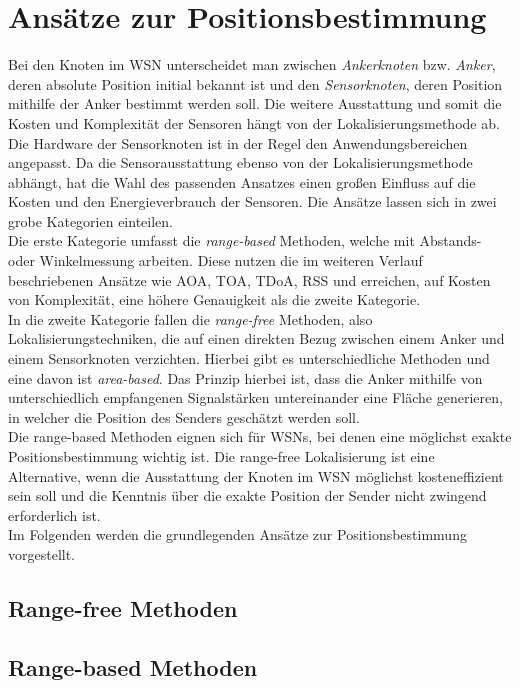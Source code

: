 \documentclass[12pt, a4wide]{scrreprt}
\begin{document}
\chapter{Ansätze zur Positionsbestimmung}
Bei den Knoten im WSN unterscheidet man zwischen \textit{Ankerknoten} bzw. \textit{Anker}, deren absolute Position initial bekannt ist und den \textit{Sensorknoten}, deren Position mithilfe der Anker bestimmt werden soll. 
Die weitere Ausstattung und somit die Kosten und Komplexität der Sensoren hängt von der Lokalisierungsmethode ab.\\
\indent
Die Hardware der Sensorknoten ist in der Regel den Anwendungsbereichen angepasst. Da die Sensorausstattung ebenso von der Lokalisierungsmethode abhängt, hat die Wahl des passenden Ansatzes einen großen Einfluss auf die Kosten und den Energieverbrauch der Sensoren. Die Ansätze lassen sich in zwei grobe Kategorien einteilen\cite{area_based}.\\
\indent
Die erste Kategorie umfasst die \textit{range-based} Methoden, welche mit Abstands- oder Winkelmessung arbeiten. Diese nutzen die im weiteren Verlauf beschriebenen Ansätze wie AOA, TOA, TDoA, RSS und erreichen, auf Kosten von Komplexität, eine höhere Genauigkeit als die zweite Kategorie.\\
\indent
In die zweite Kategorie fallen die \textit{range-free} Methoden, also Lokalisierungstechniken, die auf einen direkten Bezug zwischen einem Anker und einem Sensorknoten verzichten. Hierbei gibt es unterschiedliche Methoden und eine davon ist \textit{area-based}\cite{area_based}. Das Prinzip hierbei ist, dass die Anker mithilfe von unterschiedlich empfangenen Signalstärken untereinander eine Fläche generieren, in welcher die Position des Senders geschätzt werden soll.\\
\indent
Die range-based Methoden eignen sich für WSNs, bei denen eine möglichst exakte Positionsbestimmung wichtig ist. Die range-free Lokalisierung ist eine Alternative, wenn die Ausstattung der Knoten im WSN möglichst kosteneffizient sein soll und die Kenntnis über die exakte Position der Sender nicht zwingend erforderlich ist.\\ 
\indent
Im Folgenden werden die grundlegenden Ansätze zur Positionsbestimmung vorgestellt.

\section{Range-free Methoden}
\section{Range-based Methoden}
\end{document}
